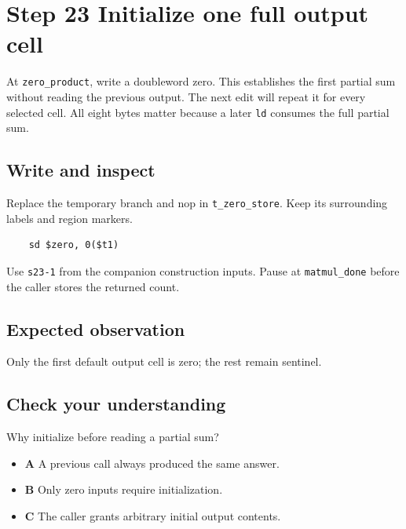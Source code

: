 \section{Step 23 Initialize one full output cell}\label{matmul-s23}

At \texttt{zero\_product}, write a doubleword zero. This establishes the first partial sum without reading the previous output. The next edit will repeat it for every selected cell. All eight bytes matter because a later \texttt{ld} consumes the full partial sum.

\subsection{Write and inspect}
Replace the temporary branch and nop in \texttt{t\_zero\_store}. Keep its surrounding labels and region markers.

\begin{verbatim}
    sd $zero, 0($t1)
\end{verbatim}
Use \texttt{s23-1} from the companion construction inputs. Pause at \texttt{matmul\_done} before the caller stores the returned count.

\subsection{Expected observation}
Only the first default output cell is zero; the rest remain sentinel.

\subsection{Check your understanding}
Why initialize before reading a partial sum?

\begin{itemize}
  \item \textbf{A} A previous call always produced the same answer.
  \item \textbf{B} Only zero inputs require initialization.
  \item \textbf{C} The caller grants arbitrary initial output contents.
\end{itemize}
